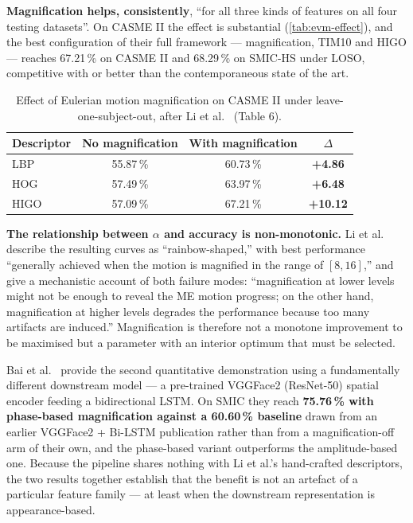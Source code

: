 \textbf{Magnification helps, consistently}, ``for all three kinds of features on all four testing datasets''. On CASME II the effect is substantial (\autoref{tab:evm-effect}), and the best configuration of their full framework --- magnification, TIM10 and HIGO --- reaches 67.21\,\% on CASME II and 68.29\,\% on SMIC-HS under LOSO, competitive with or better than the contemporaneous state of the art.

\begin{table}[htbp]
	\centering
	\begin{tabular}{l c c c}
		\hline
		\textbf{Descriptor} & \textbf{No magnification} & \textbf{With magnification} & \textbf{$\Delta$} \\
		\hline
		LBP  & 55.87\,\% & 60.73\,\% & \textbf{+4.86} \\
		HOG  & 57.49\,\% & 63.97\,\% & \textbf{+6.48} \\
		HIGO & 57.09\,\% & 67.21\,\% & \textbf{+10.12} \\
		\hline
	\end{tabular}
	\caption[Effect of Eulerian motion magnification on CASME II]{Effect of Eulerian motion magnification on CASME II under leave-one-subject-out, after Li et al.~\cite{liX2018} (Table 6).}
	\label{tab:evm-effect}
\end{table}

\textbf{The relationship between $\alpha$ and accuracy is non-monotonic.} Li et al.~\cite{liX2018} describe the resulting curves as ``rainbow-shaped,'' with best performance ``generally achieved when the motion is magnified in the range of $[8, 16]$,'' and give a mechanistic account of both failure modes: ``magnification at lower levels might not be enough to reveal the ME motion progress; on the other hand, magnification at higher levels degrades the performance because too many artifacts are induced.'' Magnification is therefore not a monotone improvement to be maximised but a parameter with an interior optimum that must be selected.

Bai et al.~\cite{bai2021} provide the second quantitative demonstration using a fundamentally different downstream model --- a pre-trained VGGFace2 (ResNet-50) spatial encoder feeding a bidirectional LSTM. On SMIC they reach \textbf{75.76\,\% with phase-based magnification against a 60.60\,\% baseline} drawn from an earlier VGGFace2 + Bi-LSTM publication rather than from a magnification-off arm of their own, and the phase-based variant outperforms the amplitude-based one. Because the pipeline shares nothing with Li et al.'s hand-crafted descriptors, the two results together establish that the benefit is not an artefact of a particular feature family --- at least when the downstream representation is appearance-based.

